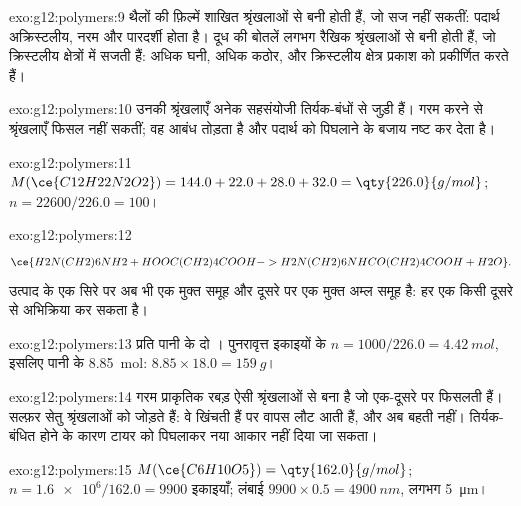 \begin{solution}{exo:g12:polymers:9}
थैलों की फ़िल्में शाखित श्रृंखलाओं से बनी होती हैं, जो सज नहीं सकतीं: पदार्थ
अक्रिस्टलीय, नरम और पारदर्शी होता है। दूध की बोतलें लगभग
रैखिक श्रृंखलाओं से बनी होती हैं, जो क्रिस्टलीय क्षेत्रों में सजती हैं: अधिक घनी, अधिक कठोर, और
क्रिस्टलीय क्षेत्र प्रकाश को प्रकीर्णित करते हैं।
\end{solution}

\begin{solution}{exo:g12:polymers:10}
उनकी श्रृंखलाएँ अनेक सहसंयोजी तिर्यक-बंधों से जुड़ी हैं। गरम करने से
श्रृंखलाएँ फिसल नहीं सकतीं; वह आबंध तोड़ता है और पदार्थ को पिघलाने के बजाय
नष्ट कर देता है।
\end{solution}

\begin{solution}{exo:g12:polymers:11}
$M(\ce{C12H22N2O2}) = 144.0 + 22.0 + 28.0 + 32.0 = \qty{226.0}{g/mol}$;
$n = 22600/226.0 = 100$।
\end{solution}

\begin{solution}{exo:g12:polymers:12}
\[
  \ce{H2N(CH2)6NH2 + HOOC(CH2)4COOH -> H2N(CH2)6NHCO(CH2)4COOH + H2O} .
\]
उत्पाद के एक सिरे पर अब भी एक मुक्त  समूह और दूसरे पर एक मुक्त अम्ल
समूह है: हर एक किसी दूसरे  से अभिक्रिया कर सकता है।
\end{solution}

\begin{solution}{exo:g12:polymers:13}
प्रति  पानी के दो । पुनरावृत्त इकाइयों के $n = 1000/226.0 =
\qty{4.42}{mol}$, इसलिए पानी के \qty{8.85}{mol}:
$8.85 \times 18.0 = \qty{159}{g}$।
\end{solution}

\begin{solution}{exo:g12:polymers:14}
गरम प्राकृतिक रबड़ ऐसी श्रृंखलाओं से बना है जो एक-दूसरे पर फिसलती हैं।
सल्फ़र सेतु श्रृंखलाओं को जोड़ते हैं: वे खिंचती हैं पर वापस लौट आती हैं, और अब
बहती नहीं। तिर्यक-बंधित होने के कारण टायर को पिघलाकर नया आकार नहीं दिया जा सकता।
\end{solution}

\begin{solution}{exo:g12:polymers:15}
$M(\ce{C6H10O5}) = \qty{162.0}{g/mol}$; $n = \num{1.6e6}/162.0 = 9900$
इकाइयाँ; लंबाई $9900 \times 0.5 = \qty{4900}{nm}$, लगभग
\qty{5}{\micro m}।
\end{solution}

